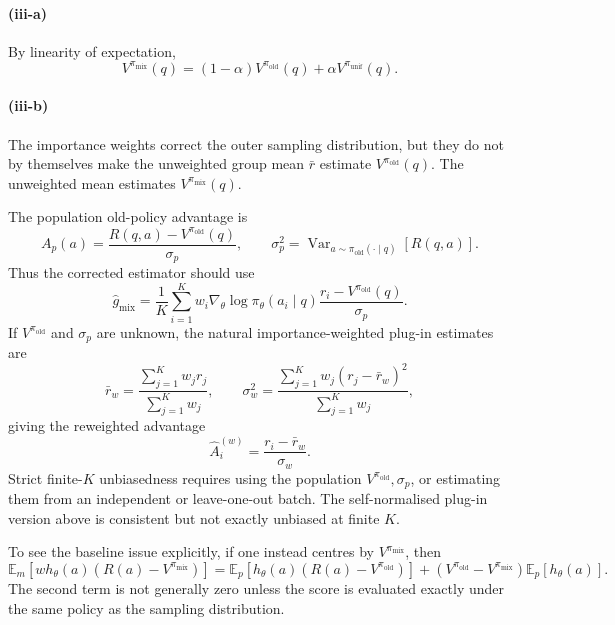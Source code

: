 \paragraph{(iii-a)}
By linearity of expectation,
\[
\boxed{
V^{\pi_{\mathrm{mix}}}(q)
=
(1-\alpha)V^{\pi_{\mathrm{old}}}(q)
+
\alpha V^{\pi_{\mathrm{unif}}}(q).
}
\]

\paragraph{(iii-b)}
The importance weights correct the outer sampling distribution, but they do not
by themselves make the unweighted group mean \(\bar r\) estimate
\(V^{\pi_{\mathrm{old}}}(q)\). The unweighted mean estimates
\(V^{\pi_{\mathrm{mix}}}(q)\).

The population old-policy advantage is
\[
A_p(a)
=
\frac{R(q,a)-V^{\pi_{\mathrm{old}}}(q)}
{\sigma_p},
\qquad
\sigma_p^2
=
\operatorname{Var}_{a\sim\pi_{\mathrm{old}}(\cdot\mid q)}[R(q,a)].
\]
Thus the corrected estimator should use
\[
\boxed{
\hat g_{\mathrm{mix}}
=
\frac{1}{K}
\sum_{i=1}^K
w_i
\nabla_\theta\log\pi_\theta(a_i\mid q)
\frac{r_i-V^{\pi_{\mathrm{old}}}(q)}{\sigma_p}.
}
\]
If \(V^{\pi_{\mathrm{old}}}\) and \(\sigma_p\) are unknown, the natural
importance-weighted plug-in estimates are
\[
\bar r_w
=
\frac{\sum_{j=1}^K w_j r_j}{\sum_{j=1}^K w_j},
\qquad
\sigma_w^2
=
\frac{\sum_{j=1}^K w_j(r_j-\bar r_w)^2}{\sum_{j=1}^K w_j},
\]
giving the reweighted advantage
\[
\boxed{
\hat A_i^{(w)}
=
\frac{r_i-\bar r_w}{\sigma_w}.
}
\]
Strict finite-\(K\) unbiasedness requires using the population
\(V^{\pi_{\mathrm{old}}},\sigma_p\), or estimating them from an independent or
leave-one-out batch. The self-normalised plug-in version above is consistent but
not exactly unbiased at finite \(K\).

To see the baseline issue explicitly, if one instead centres by
\(V^{\pi_{\mathrm{mix}}}\), then
\[
\mathbb E_m[w h_\theta(a)(R(a)-V^{\pi_{\mathrm{mix}}})]
=
\mathbb E_p[h_\theta(a)(R(a)-V^{\pi_{\mathrm{old}}})]
+
\left(
V^{\pi_{\mathrm{old}}}-V^{\pi_{\mathrm{mix}}}
\right)
\mathbb E_p[h_\theta(a)].
\]
The second term is not generally zero unless the score is evaluated exactly
under the same policy as the sampling distribution.


